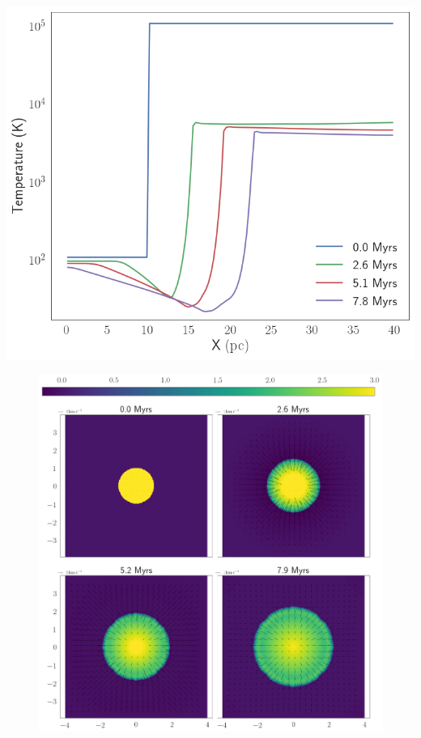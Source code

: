 	\begin{marginfigure}
		\centering
		\includegraphics[width=1\linewidth]{DataImages/H2CoolingTMPprofile}
		\caption{}
		\label{fig:h2coolingtmpprofile}
	\end{marginfigure}
	
	
\begin{figure}[h]
	\centering
	\includegraphics[width=1\linewidth]{DataImages/H2CoolingRHOquad}
	\caption{}
	\label{fig:h2coolingrhoquad}
\end{figure}


